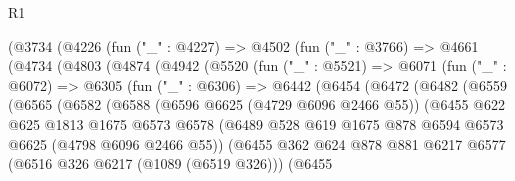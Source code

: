 \begin{lexlean}{R1}
\begin{coremodule}
              (@3734
                (@4226
                  (fun ("_" : @4227) =>
                  @4502
                    (fun ("_" : @3766) =>
                    @4661
                      (@4734
                        (@4803
                          (@4874
                            (@4942
                              (@5520
                                (fun ("_" : @5521) =>
                                @6071
                                  (fun ("_" : @6072) =>
                                  @6305
                                    (fun ("_" : @6306) =>
                                    @6442
                                      (@6454
                                        (@6472
                                          (@6482
                                            (@6559
                                              (@6565
                                                (@6582
                                                  (@6588
                                                    (@6596 @6625 (@4729 @6096 @2466 @55))
                                                    (@6455
                                                      @622
                                                      @625
                                                      @1813
                                                      @1675
                                                      @6573
                                                      @6578
                                                      (@6489
                                                        @528
                                                        @619
                                                        @1675
                                                        @878
                                                        @6594
                                                        @6573
                                                        @6625
                                                        (@4798 @6096 @2466 @55))
                                                      (@6455
                                                        @362
                                                        @624
                                                        @878
                                                        @881
                                                        @6217
                                                        @6577
                                                        (@6516 @326 @6217 (@1089 (@6519 @326)))
                                                        (@6455

\end{coremodule}
\end{lexlean}
